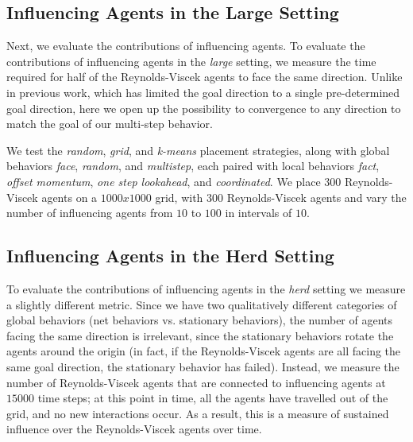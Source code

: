 \subsection{Influencing Agents in the Large Setting}
Next, we evaluate the contributions of influencing agents.
To evaluate the contributions of influencing agents in the \textit{large}
setting, we measure the time required for half of the Reynolds-Viscek agents
to face the same direction.
Unlike in previous work, which has limited the goal direction to a single
pre-determined goal direction, here we open up the possibility to convergence
to any direction to match the goal of our multi-step behavior.

We test the \textit{random}, \textit{grid}, and \textit{k-means} placement
strategies, along with global behaviors \textit{face}, \textit{random}, and
\textit{multistep}, each paired with local behaviors \textit{fact},
\textit{offset momentum}, \textit{one step lookahead}, and \textit{coordinated}.
We place $300$ Reynolds-Viscek agents on a $1000x1000$ grid, with $300$
Reynolds-Viscek agents and vary the number of influencing agents from $10$
to $100$ in intervals of $10$.

\subsection{Influencing Agents in the Herd Setting}
To evaluate the contributions of influencing agents in the \textit{herd} setting
we measure a slightly different metric.
Since we have two qualitatively different categories of global behaviors (net
behaviors vs. stationary behaviors), the number of agents facing the same
direction is irrelevant, since the stationary behaviors rotate the agents around
the origin (in fact, if the Reynolds-Viscek agents are all facing the same
goal direction, the stationary behavior has failed).
Instead, we measure the number of Reynolds-Viscek agents that are connected to
influencing agents at $15000$ time steps; at this point in time, all the agents
have travelled out of the grid, and no new interactions occur.
As a result, this is a measure of sustained influence over the Reynolds-Viscek
agents over time.

